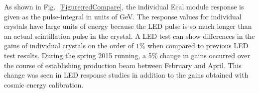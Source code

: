 As shown in Fig.~\ref{Figure:redCompare}, the individual Ecal module response is given as the pulse-integral in units of GeV. The response values for individual crystals have large units of energy because the LED pulse is so much longer than an actual scintillation pulse in the crystal. A LED test can show differences in the gains of individual crystals on the order of $1\%$ when compared to previous LED test results. During the spring 2015 running, a 5$\%$ change in gains occurred over the course of establishing production beam between February and April. This change was seen in LED response studies in addition to the gains obtained with cosmic energy calibration.

